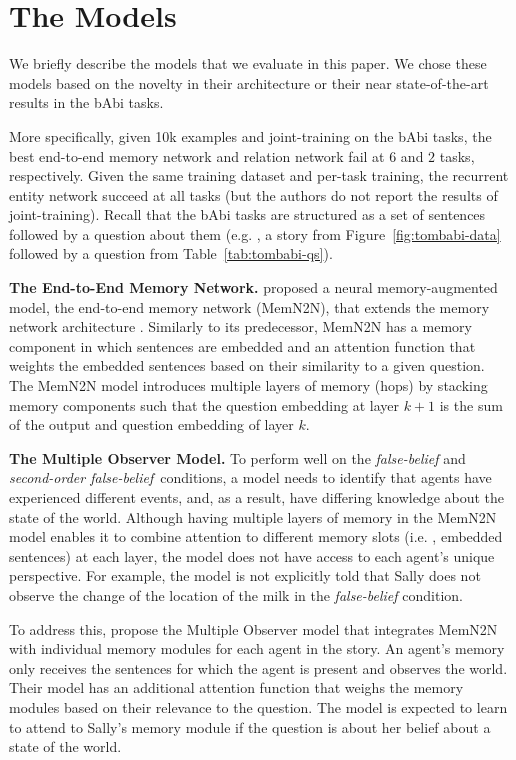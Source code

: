 \section{The Models}

We briefly describe the models that we evaluate in this paper. We chose these models based on the novelty in their architecture or their near state-of-the-art results in the bAbi tasks. 

More specifically, given 10k examples and joint-training on the bAbi tasks, the best end-to-end memory network \citep{sukhbaatar2015end} and relation network \citep{santoro.etal.2017} fail at $6$ and $2$ tasks, respectively. Given the same training dataset and per-task training, the recurrent entity network succeed at all tasks (but the authors do not report the results of joint-training).  Recall that the bAbi tasks are structured as a set of sentences followed by a question about them (e.g. , a story from
Figure~\ref{fig:tombabi-data} followed by a question from Table~\ref{tab:tombabi-qs}).

\textbf{The End-to-End Memory Network.}
\citet{sukhbaatar2015end} proposed a neural memory-augmented model, the end-to-end memory network (MemN2N), that extends the memory network architecture \citep{weston.2014arXiv}. Similarly to its predecessor, MemN2N has a memory component in which sentences are embedded and an attention function that weights the embedded sentences based on their similarity to a given question. The MemN2N model introduces multiple layers of memory (hops) by stacking memory components such that the question embedding at layer $k+1$ is the sum of the output and question embedding of layer $k$. 

\textbf{The Multiple Observer Model.} To perform well on the \textit{false-belief} and \textit{second-order false-belief}\, conditions, a model needs to identify that agents have experienced different events, and, as a result, have differing knowledge about the state of the world.  Although having multiple layers of memory in the MemN2N model enables it to combine attention to different memory slots (i.e. , embedded sentences) at each layer, the model does not have access to each agent's unique perspective. For example, the model is not explicitly told that Sally does not observe the change of the location of the milk in the
\textit{false-belief} condition.

To address this, \citet{grant.etal.2017} propose the Multiple Observer model that integrates MemN2N with individual memory modules for each agent in the story. An agent's memory only receives the sentences for which the agent is present and observes the world. Their model has an additional attention function that weighs the memory modules based on their relevance to the question. The model is expected to learn to attend to Sally's memory module if the question is about her belief about a state of the world.

